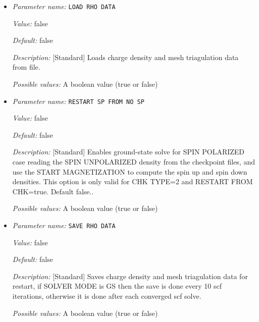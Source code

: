 \begin{itemize}
\item {\it Parameter name:} {\tt LOAD RHO DATA}
\label{parameters:SCF Checkpointing and Restart/LOAD RHO DATA}
\label{parameters:SCF_20Checkpointing_20and_20Restart/LOAD_20RHO_20DATA}


{\it Value:} false


{\it Default:} false


{\it Description:} [Standard] Loads charge density and mesh triagulation data from file.


{\it Possible values:} A boolean value (true or false)
\item {\it Parameter name:} {\tt RESTART SP FROM NO SP}
\label{parameters:SCF Checkpointing and Restart/RESTART SP FROM NO SP}
\label{parameters:SCF_20Checkpointing_20and_20Restart/RESTART_20SP_20FROM_20NO_20SP}


{\it Value:} false


{\it Default:} false


{\it Description:} [Standard] Enables ground-state solve for SPIN POLARIZED case reading the SPIN UNPOLARIZED density from the checkpoint files, and use the START MAGNETIZATION to compute the spin up and spin down densities. This option is only valid for CHK TYPE=2 and RESTART FROM CHK=true. Default false..


{\it Possible values:} A boolean value (true or false)
\item {\it Parameter name:} {\tt SAVE RHO DATA}
\label{parameters:SCF Checkpointing and Restart/SAVE RHO DATA}
\label{parameters:SCF_20Checkpointing_20and_20Restart/SAVE_20RHO_20DATA}


{\it Value:} false


{\it Default:} false


{\it Description:} [Standard] Saves charge density and mesh triagulation data for restart, if SOLVER MODE is GS then the save is done every 10 scf iterations, otherwise it is done after each converged scf solve.


{\it Possible values:} A boolean value (true or false)
\end{itemize}

